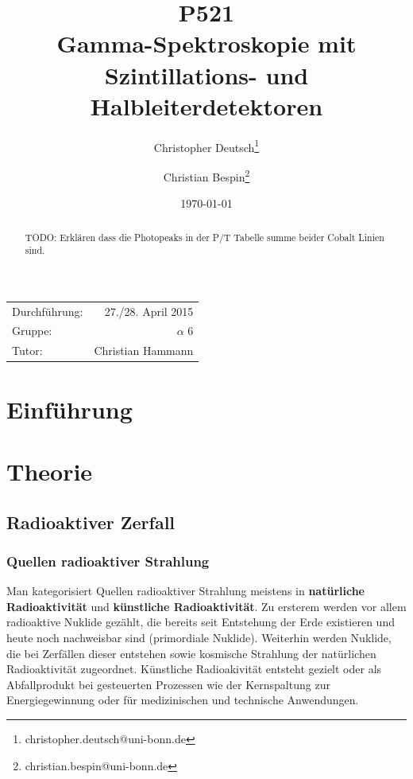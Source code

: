 \documentclass[11pt, a4paper]{article}
\title{P521 \\ Gamma-Spektroskopie mit Szintillations- und Halbleiterdetektoren}
\author{Christopher Deutsch\footnote{christopher.deutsch@uni-bonn.de} \and Christian Bespin\footnote{christian.bespin@uni-bonn.de}}
\date{\today}
\numberwithin{equation}{section}
\begin{document}
\begin{titlepage}

\maketitle

\begin{center}
\begin{tabular}{l r}
Durchführung: & 27./28. April 2015 \\
Gruppe: & $\alpha$ 6 \\
Tutor: & Christian Hammann
\end{tabular}
\end{center}

\begin{abstract}
\noindent
TODO: Erklären dass die Photopeaks in der P/T Tabelle summe beider Cobalt Linien sind.

\end{abstract}

\end{titlepage}

\tableofcontents
\newpage


\section{Einführung}

\section{Theorie}

\subsection{Radioaktiver Zerfall}

\subsubsection{Quellen radioaktiver Strahlung}
\label{sssec:quellen_radioaktivität}
Man kategorisiert Quellen radioaktiver Strahlung meistens in \textbf{natürliche Radioaktivität} und \textbf{künstliche Radioaktivität}.
Zu ersterem werden vor allem radioaktive Nuklide gezählt, die bereits seit Entstehung der Erde existieren und heute noch nachweisbar sind (primordiale Nuklide).
Weiterhin werden Nuklide, die bei Zerfällen dieser entstehen sowie kosmische Strahlung der natürlichen Radioaktivität zugeordnet.
Künstliche Radioakivität entsteht gezielt oder als Abfallprodukt bei gesteuerten Prozessen wie der Kernspaltung zur Energiegewinnung oder für medizinischen und technische Anwendungen.
\end{document}
